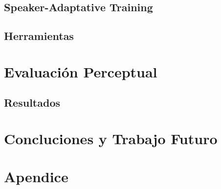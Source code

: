 \documentclass[11pt,a4paper,twoside]{tesis}
\begin{document}
\section{Speaker-Adaptative Training}\label{speakerAdaptativeTraining}


\section{Herramientas} \label{herramientas}

\pagebreak
\chapter{Evaluación Perceptual}\label{evaluacionPerceptual}

\pagebreak

\section{Resultados}

\pagebreak

\chapter{Concluciones y Trabajo Futuro}

\pagebreak
\chapter{Apendice}


\backmatter
%
\end{document}
